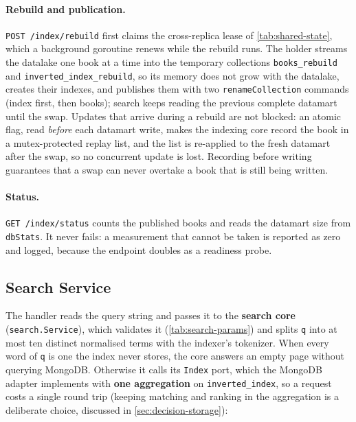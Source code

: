 \documentclass[10pt,a4paper]{article}
\newcommand{\code}[1]{\texttt{#1}}
\newcommand{\route}[1]{\texttt{#1}}
\begin{document}
\paragraph{Rebuild and publication.}
\route{POST /index/rebuild} first claims the cross-replica lease of
\cref{tab:shared-state}, which a background goroutine renews while the rebuild
runs. The holder streams the datalake one book at a time into the temporary
collections \code{books\_rebuild} and \code{inverted\_index\_rebuild}, so its
memory does not grow with the datalake, creates their indexes, and publishes
them with two \code{renameCollection} commands (index first, then books);
search keeps reading the previous complete datamart until the swap. Updates that
arrive during a rebuild are not blocked: an atomic flag, read \emph{before}
each datamart write, makes the indexing core record the book in a
mutex-protected replay list, and the list is re-applied to the fresh datamart after the swap,
so no concurrent update is lost. Recording before writing guarantees that a
swap can never overtake a book that is still being written.

\paragraph{Status.}
\route{GET /index/status} counts the published books and reads the datamart
size from \code{dbStats}. It never fails: a measurement that cannot be taken
is reported as zero and logged, because the endpoint doubles as a readiness
probe.

\subsection{Search Service}
\label{sec:impl-search}

The handler reads the query string and passes it to the \textbf{search core}
(\code{search.Service}), which validates it (\cref{tab:search-params}) and
splits \code{q} into at most ten distinct normalised terms with the indexer's
tokenizer. When every word of \code{q} is one the index never stores, the core
answers an empty page without querying MongoDB. Otherwise it calls its
\code{Index} port, which the MongoDB adapter implements with \textbf{one
aggregation} on \code{inverted\_index}, so a request costs a single round trip
(keeping matching and ranking in the aggregation is a deliberate choice,
discussed in \cref{sec:decision-storage}):
\end{document}
